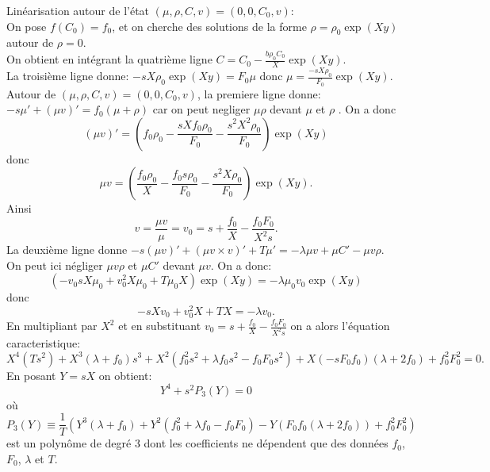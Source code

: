 \documentclass[11pt]{article}
\begin{document}
Linéarisation autour de l’état  $(\mu,\rho,C,v) = (0,0,C_0,v)$: \\
On pose $f(C_0) = f_0$, et on cherche des solutions de la forme $\rho = \rho_0 \exp(Xy)$ autour de $\rho=0$.\\ 
On obtient en intégrant la quatrième ligne $C= C_0 - \frac{b\rho_0 C_0}{X}\exp(Xy).$\\
La troisième ligne donne: $-sX\rho_0\exp(Xy)=F_0\mu$ donc $\mu = \frac{-sX\rho_0}{F_0}\exp(Xy)$.\\
Autour de $(\mu,\rho,C,v) = (0,0,C_0,v)$, la premiere ligne donne: $-s\mu' + (\mu v)' = f_0(\mu + \rho)$ car on peut negliger $\mu\rho$ devant $\mu$ et $\rho$ . On a donc \begin{equation}
	(\mu v)'=(f_0\rho_0-\frac{sXf_0\rho_0}{F_0}-\frac{s^2X^2\rho_0}{F_0})\exp(Xy)
\end{equation}
donc \begin{equation}
	\mu v = (\frac{f_0\rho_0}{X}- \frac{f_0s\rho_0}{F_0}-\frac{s^2X\rho_0}{F_0})\exp(Xy).
\end{equation}
Ainsi \begin{equation}
	v= \frac{\mu v}{\mu} = v_0 = s + \frac{f_0}{X}-\frac{f_0F_0}{X^2s}  .
\end{equation}
La deuxième ligne donne $-s (\mu v)'+(\mu v\times v)' +T\mu'=-\lambda\mu v+\mu C'-\mu v \rho$. \\
On peut ici négliger $\mu v\rho$ et $\mu C'$ devant $\mu v$. On a donc: \begin{equation}
	(-v_0sX\mu_0 + v_0^2X\mu_0 +T\mu_0X)\exp(Xy) = -\lambda\mu_0v_0\exp(Xy)
\end{equation}
donc \begin{equation}
	-sXv_0 + v_0^2X+ TX = -\lambda v_0.
\end{equation}
En multipliant par $X^2$ et en substituant $v_0 =  s + \frac{f_0}{X}-\frac{f_0F_0}{X^2s}$ on a alors l’équation caracteristique:
\begin{equation} \label{eq:P}
	X^4(Ts^2) + X^3(\lambda + f_0)s^3+ X^2(f_0^2s^2+ \lambda f_0 s^2 - f_0F_0s^2)+ X(-sF_0f_0)(\lambda+2f_0) + f_0^2F_0^2=0.
\end{equation}
En posant $Y = sX$ on obtient: \begin{equation}
	Y^4+s^2P_3(Y)=0 \label{eq:PY}
\end{equation} où \begin{equation}
		P_3(Y) \equiv \frac{1}{T}(  Y^3(\lambda + f_0)+ Y^2(f_0^2+ \lambda f_0 - f_0F_0)- Y(F_0f_0(\lambda+2f_0)) + f_0^2F_0^2)
\end{equation} est un polynôme de degré 3 dont les coefficients ne dépendent que des données $f_0$, $F_0$, $\lambda$ et $T$. \\
\end{document}
